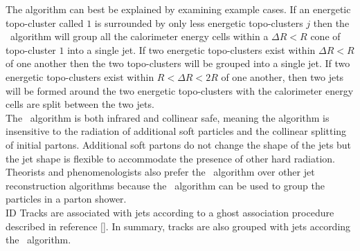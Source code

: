 \indent The algorithm can best be explained by examining example cases.  If an energetic topo-cluster called $1$ is surrounded by only less energetic topo-clusters $j$ then the \antikt\ algorithm will group all the calorimeter energy cells within a $\Delta R < R$ cone of topo-cluster $1$ into a single jet.  If two energetic topo-clusters exist within $\Delta R<R$ of one another then the two topo-clusters will be grouped into a single jet.  If two energetic topo-clusters exist within $R<\Delta R<2R$ of one another, then two jets will be formed around the two energetic topo-clusters with the calorimeter energy cells are split between the two jets. \\



\indent  The \antikt\ algorithm is both infrared and collinear safe, meaning the algorithm is insensitive to the radiation of additional soft particles and the collinear splitting of initial partons.  Additional soft partons do not change the shape of the jets but the jet shape is flexible to accommodate the presence of other hard radiation. Theorists and phenomenologists also prefer the \antikt\ algorithm over other jet reconstruction algorithms because the \antikt\ algorithm can be used to group the particles in a parton shower.  \\

\indent ID Tracks are associated with jets according to a ghost association procedure described in reference [\cite{JetAreaGhostAssociate}]. In summary, tracks are also grouped with jets according the \antikt\ algorithm. \\ %

